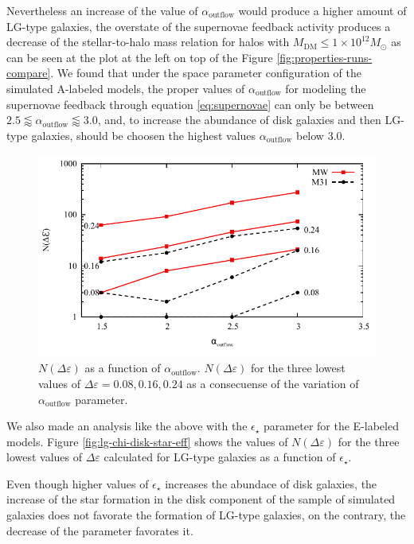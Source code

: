 \documentclass[usenatbib]{mn2e}
\begin{document}
Nevertheless an increase of the value of $\alpha_{\text{outflow}}$ would produce a higher amount of LG-type galaxies, 
the overstate of the supernovae feedback activity produces a decrease of the stellar-to-halo mass relation for halos with 
$M_{\text{DM}}\le 1\times 10^{12}M_{\odot}$ as can be seen at the plot at the left on top of the Figure \ref{fig:properties-runs-compare}. We found that
 under the space parameter configuration of the simulated A-labeled models,  the proper values of $\alpha_{\text{outflow}}$ 
for modeling the supernovae feedback through  equation \ref{eq:supernovae} can only be  between $2.5 \lessapprox \alpha_{\text{outflow}} \lessapprox 3.0$,
 and, to increase the abundance of disk galaxies and then LG-type galaxies, should be choosen the highest values $\alpha_{\text{outflow}}$ below $3.0$.
\begin{figure}
\centering
 \includegraphics[scale=0.68]{figures/chi-parameters/chi-squared-disk-outflow-exp-v2.pdf}
\caption{$N(\Delta\varepsilon)$ as a function of $\alpha_{\text{outflow}}$. $N(\Delta\varepsilon)$ for the three lowest values of 
$\Delta\varepsilon=0.08,0.16,0.24$ as a consecuense of the variation of $\alpha_{\text{outflow}}$ parameter. \label{fig:lg-chi-disk-outflow}}
\end{figure}

We also made an analysis like the above with the $\epsilon_{\star}$ parameter for the E-labeled models. Figure \ref{fig:lg-chi-disk-star-eff} shows  
 the values of $N(\Delta\varepsilon)$ for the three lowest values of $\Delta\varepsilon$ calculated for LG-type galaxies as a function of $\epsilon_{\star}$.
 
Even though higher values of  $\epsilon_{\star}$ increases the abundace of disk galaxies, the increase  of the star  formation in the disk component of the 
sample of simulated galaxies does not favorate the formation of LG-type  galaxies, on the contrary, the decrease of the parameter favorates it.
\end{document}
